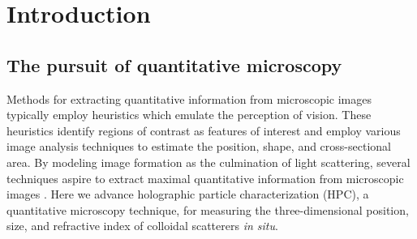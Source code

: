 \chapter{Introduction}
\label{ch:intro}









\section{The pursuit of quantitative microscopy}

Methods for extracting quantitative information from microscopic
images typically employ heuristics which emulate the perception of vision.
These heuristics identify regions of contrast as features
of interest and employ various image analysis techniques to estimate
the position, shape, and cross-sectional area.
By modeling image formation as the culmination of light scattering,
several techniques aspire to extract maximal quantitative information
from microscopic images \cite{lee07,bierbaum2017}.
Here we advance holographic particle characterization (HPC),
a quantitative microscopy technique, for measuring
the three-dimensional position, size, and refractive index of
colloidal scatterers \emph{in situ}.

